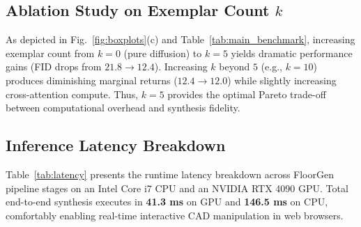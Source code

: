 \documentclass[journal]{IEEEtran}
\begin{document}
\subsection{Ablation Study on Exemplar Count $k$}
As depicted in Fig.~\ref{fig:boxplots}(c) and Table~\ref{tab:main_benchmark}, increasing exemplar count from $k=0$ (pure diffusion) to $k=5$ yields dramatic performance gains (FID drops from $21.8 \rightarrow 12.4$). Increasing $k$ beyond $5$ (e.g., $k=10$) produces diminishing marginal returns ($12.4 \rightarrow 12.0$) while slightly increasing cross-attention compute. Thus, $k=5$ provides the optimal Pareto trade-off between computational overhead and synthesis fidelity.

\subsection{Inference Latency Breakdown}
Table~\ref{tab:latency} presents the runtime latency breakdown across FloorGen pipeline stages on an Intel Core i7 CPU and an NVIDIA RTX 4090 GPU. Total end-to-end synthesis executes in \textbf{41.3 ms} on GPU and \textbf{146.5 ms} on CPU, comfortably enabling real-time interactive CAD manipulation in web browsers.

\begin{table}[!t]
\caption{Inference Runtime Latency Breakdown}
\label{tab:latency}
\centering
{}
\end{table}
\end{document}
